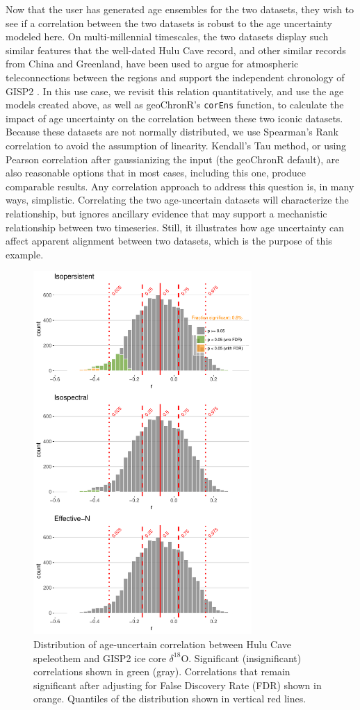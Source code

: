 \documentclass[gchron, manuscript]{copernicus}
\begin{document}
Now that the user has generated age ensembles for the two datasets, they wish to see if a correlation between the two datasets is robust to the age uncertainty modeled here.
On multi-millennial timescales, the two datasets display such similar features that the well-dated Hulu Cave record, and other similar records from China and Greenland, have been used to argue for atmospheric teleconnections between the regions and support the independent chronology of GISP2 \citep{hulu2001}.
In this use case, we revisit this relation quantitatively, and use the age models created above, as well as geoChronR's \texttt{corEns} function, to calculate the impact of age uncertainty on the correlation between these two iconic datasets.
Because these datasets are not normally distributed, we use Spearman's Rank correlation to avoid the assumption of linearity.
Kendall's Tau method, or using Pearson correlation after gaussianizing the input (the geoChronR default), are also reasonable options that in most cases, including this one, produce comparable results.
Any correlation approach to address this question is, in many ways, simplistic.
Correlating the two age-uncertain datasets will characterize the relationship, but ignores ancillary evidence that may support a mechanistic relationship between two timeseries.
Still, it illustrates how age uncertainty can affect apparent alignment between two datasets, which is the purpose of this example.

\begin{figure}
\includegraphics[width=8.3cm]{geoChronR-paper_files/figure-latex/cor-hist-1} \caption{Distribution of age-uncertain correlation between Hulu Cave speleothem and GISP2 ice core $\delta^{18}$O. Significant (insignificant) correlations shown in green (gray). Correlations that remain significant after adjusting for False Discovery Rate (FDR) shown in orange. Quantiles of the distribution shown in vertical red lines.}\label{fig:cor-hist}
\end{figure}
\end{document}
